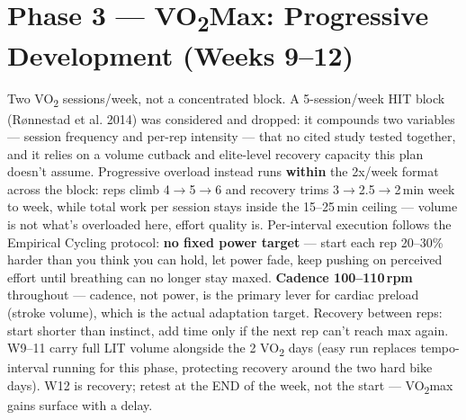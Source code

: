 \documentclass[a4paper,10pt]{article}
\newcommand{\NoteBox}[1]{%
  \noindent\colorbox{accent!6}{\begin{minipage}{\dimexpr\textwidth-2\fboxsep\relax}
  \footnotesize #1
  \end{minipage}}%
}
\begin{document}
\newpage

\section*{\color{z5accent!70!black}Phase 3 --- VO\textsubscript{2}Max: Progressive Development (Weeks 9--12)}

\NoteBox{Two VO\textsubscript{2} sessions/week, not a concentrated block. A 5-session/week
HIT block (Rønnestad et al. 2014) was considered and dropped: it compounds two variables --- session
frequency and per-rep intensity --- that no cited study tested together, and it relies on a volume
cutback and elite-level recovery capacity this plan doesn't assume. Progressive overload instead runs
\textbf{within} the 2x/week format across the block: reps climb 4$\to$5$\to$6 and recovery trims
3$\to$2.5$\to$2\,min week to week, while total work per session stays inside the 15--25\,min ceiling
--- volume is not what's overloaded here, effort quality is.
Per-interval execution follows the Empirical Cycling protocol: \textbf{no fixed power target} --- start
each rep 20--30\% harder than you think you can hold, let power fade, keep pushing on perceived effort
until breathing can no longer stay maxed. \textbf{Cadence 100--110\,rpm} throughout --- cadence, not
power, is the primary lever for cardiac preload (stroke volume), which is the actual adaptation target.
Recovery between reps: start shorter than instinct, add time only if the next rep can't reach max again.
W9--11 carry full LIT volume alongside the 2 VO\textsubscript{2} days (easy run replaces tempo-interval
running for this phase, protecting recovery around the two hard bike days). W12 is recovery; retest at
the END of the week, not the start --- VO\textsubscript{2}max gains surface with a delay.}

\medskip
\end{document}
